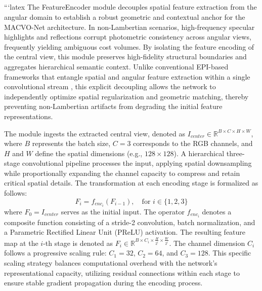 \documentclass[lettersize,journal]{IEEEtran}
\begin{document}
\subsection{}

```latex
The FeatureEncoder module decouples spatial feature extraction from the angular domain to establish a robust geometric and contextual anchor for the MACVO-Net architecture. In non-Lambertian scenarios, high-frequency specular highlights and reflections corrupt photometric consistency across angular views, frequently yielding ambiguous cost volumes. By isolating the feature encoding of the central view, this module preserves high-fidelity structural boundaries and aggregates hierarchical semantic context. Unlike conventional EPI-based frameworks that entangle spatial and angular feature extraction within a single convolutional stream \cite{heber2018}, this explicit decoupling allows the network to independently optimize spatial regularization and geometric matching, thereby preventing non-Lambertian artifacts from degrading the initial feature representations.

The module ingests the extracted central view, denoted as $I_{center} \in \mathbb{R}^{B \times C \times H \times W}$, where $B$ represents the batch size, $C=3$ corresponds to the RGB channels, and $H$ and $W$ define the spatial dimensions (e.g., $128 \times 128$). A hierarchical three-stage convolutional pipeline processes the input, applying spatial downsampling while proportionally expanding the channel capacity to compress and retain critical spatial details. The transformation at each encoding stage is formalized as follows:
\begin{equation}
F_i = f_{enc_i}(F_{i-1}), \quad \text{for } i \in \{1, 2, 3\}
\end{equation}
where $F_0 = I_{center}$ serves as the initial input. The operator $f_{enc_i}$ denotes a composite function consisting of a stride-2 convolution, batch normalization, and a Parametric Rectified Linear Unit (PReLU) activation. The resulting feature map at the $i$-th stage is denoted as $F_i \in \mathbb{R}^{B \times C_i \times \frac{H}{2^i} \times \frac{W}{2^i}}$. The channel dimension $C_i$ follows a progressive scaling rule: $C_1 = 32$, $C_2 = 64$, and $C_3 = 128$. This specific scaling strategy balances computational overhead with the network's representational capacity, utilizing residual connections \cite{he2016} within each stage to ensure stable gradient propagation during the encoding process.
\end{document}
